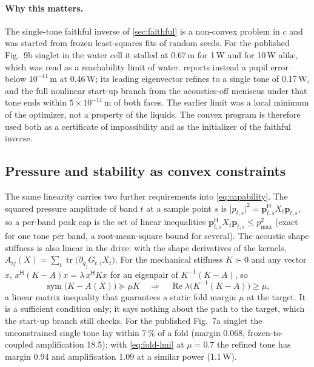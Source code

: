 \paragraph{Why this matters.} The single-tone faithful inverse of
\cref{sec:faithful} is a non-convex problem in $c$ and was started from frozen
least-squares fits of random seeds. For the published Fig.~9b singlet in the
water cell it stalled at 0.67\,\textmu m for 1\,W and for 10\,W alike, which was
read as a reachability limit of water.  reports instead a
pupil error below $10^{-11}$\,m at 0.46\,W; its leading eigenvector refines to a
single tone of 0.17\,W, and the full nonlinear start-up branch from the
acoustics-off meniscus under that tone ends within $5\times10^{-11}$\,m of both
faces. The earlier limit was a local minimum of the optimizer, not a property
of the liquids. The convex program is therefore used both as a certificate of
impossibility and as the initializer of the faithful inverse.

\subsection{Pressure and stability as convex constraints}
The same linearity carries two further requirements into
\cref{eq:capability}. The squared pressure amplitude of band $t$ at a sample
point $s$ is $\lvert p_{t,s}\rvert^2=\bm p_{t,s}^{\mathsf H}X_t\bm p_{t,s}$,
so a per-band peak cap is the set of linear inequalities
$\bm p_{t,s}^{\mathsf H}X_t\bm p_{t,s}\le p_{\max}^2$ (exact for one tone per
band, a root-mean-square bound for several). The acoustic shape stiffness is
also linear in the drive: with the shape derivatives of the kernels,
$A_{ij}(X)=\sum_t\operatorname{tr}\bigl(\partial_{q_j}G_{t,i}X_t\bigr)$. For the
mechanical stiffness $K\succ0$ and any vector $x$,
$x^{\mathsf H}(K-A)x=\lambda\,x^{\mathsf H}Kx$ for an eigenpair of
$K^{-1}(K-A)$, so
\begin{equation}
 \operatorname{sym}\bigl(K-A(X)\bigr)\succeq\mu K
 \quad\Longrightarrow\quad
 \operatorname{Re}\lambda\bigl(K^{-1}(K-A)\bigr)\ge\mu ,
 \label{eq:fold-lmi}
\end{equation}
a linear matrix inequality that guarantees a static fold margin $\mu$ at the
target. It is a sufficient condition only; it says nothing about the path to
the target, which the start-up branch still checks. For the published Fig.~7a
singlet the unconstrained single tone lay within 7\,\% of a fold (margin
0.068, frozen-to-coupled amplification 18.5); with \cref{eq:fold-lmi} at
$\mu=0.7$ the refined tone has margin 0.94 and amplification 1.09 at a
similar power (1.1\,W).


